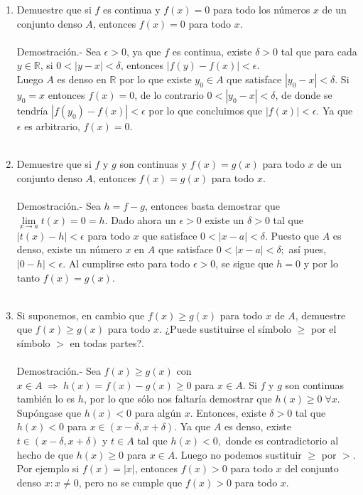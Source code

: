 \begin{enumerate}[\bfseries 1.]
\begin{enumerate}[\bfseries (a)]
	    \item Demuestre que si $f$ es continua y $f(x)=0$ para todo los números $x$ de un conjunto denso $A$, entonces $f(x)=0$ para todo $x$.\\\\
		Demostración.-\; Sea $\epsilon>0$, ya que $f$ es continua, existe $\delta>0$ tal que para cada $y\in \mathbb{R}$, si $0<|y-x|<\delta$, entonces $|f(y)-f(x)|<\epsilon.$\\
		Luego $A$ es denso en $\mathbb{R}$ por lo que existe $y_0\in A$ que satisface $|y_0-x|<\delta.$ Si $y_0=x$ entonces $f(x)=0$, de lo contrario $0<|y_0-x|<\delta$, de donde se tendría $|f(y_0)-f(x)|<\epsilon$ por lo que concluimos que $|f(x)|<\epsilon.$ Ya que $\epsilon$ es arbitrario, $f(x)=0$.\\\\

	    \item Demuestre que si $f$ y $g$ son continuas y $f(x)=g(x)$ para todo $x$ de un conjunto denso $A$, entonces $f(x)=g(x)$ para todo $x$.\\\\
		Demostración.-\; Sea $h = f-g$, entonces basta demostrar que $\lim\limits_{x\to a} t(x) = 0 = h$. Dado ahora un $\epsilon>0$ existe un $\delta>0$ tal que $|t(x)-h|<\epsilon$ para todo $x$ que satisface $0<|x-a|<\delta$. Puesto que $A$ es denso, existe un número $x$ en $A$ que satisface $0<|x-a|<\delta;$ así pues, $|0-h|<\epsilon$. Al cumplirse esto para todo $\epsilon>0$, se sigue que $h=0$ y por lo tanto $f(x)=g(x).$\\\\

	    \item Si suponemos, en cambio que $f(x)\geq g(x)$ para todo $x$ de $A$, demuestre que $f(x)\geq g(x)$ para todo $x$. ¿Puede sustituirse el símbolo $\geq$ por el símbolo $>$ en todas partes?.\\\\
		Demostración.-\; Sea $f(x)\geq g(x)$ con $x\in A \; \Longrightarrow \; h(x)=f(x)-g(x)\geq 0$ para $x\in A$. Si $f$ y $g$ son continuas también lo es $h$, por lo que sólo nos faltaría demostrar que $h(x)\geq 0\; \forall x$. Supóngase que $h(x)<0$ para algún $x$. Entonces, existe $\delta>0$ tal que $h(x)<0$ para $x\in (x-\delta,x+\delta)$. Ya que $A$ es denso, existe $t\in (x-\delta,x+\delta)$ y $t\in A$ tal que $h(x)<0,$ donde es contradictorio al hecho de que $h(x)\geq 0$ para $x\in A$. Luego no podemos sustituir $\geq$ por $>$. Por ejemplo si $f(x)=|x|$, entonces $f(x)>0$ para todo $x$ del conjunto denso ${x:x\neq 0}$, pero no se cumple que $f(x)>0$ para todo $x$.\\\\ 


\end{enumerate}
\end{enumerate}
